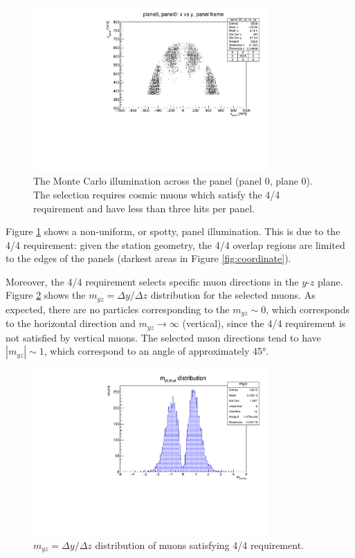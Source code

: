 \begin{figure}[!h]
    \centering
    \includegraphics[width =0.8\textwidth]{figures/pdf/xp_vs_yp_panel0.pdf}
    \caption[Monte Carlo illumination across 
    the panel (panel 0, plane 0).]{
        The Monte Carlo illumination 
        across the panel (panel 0, plane 0).
        The selection requires cosmic muons which 
        satisfy the 4/4 requirement and have 
        less than three hits per panel.}
    \label{fig:illumination}
\end{figure}
Figure \ref{fig:illumination} shows a 
non-uniform, or spotty, 
panel illumination. This is due to the 4/4 requirement: 
given the station geometry, the 4/4 overlap 
regions are limited to the edges of the panels (darkest 
areas in Figure \ref{fig:coordinate}). 

Moreover, the 4/4 requirement selects specific
muon directions in the $y$-$z$ plane. 
Figure \ref{fig:myz} shows the 
$m_{yz}=\Delta y /\Delta z$ distribution 
for the selected muons. 
As expected, there are no particles corresponding 
to the $m_{yz}\sim 0$, which corresponds to the  
horizontal direction and 
$m_{yz} \rightarrow \infty$ (vertical), since the 
4/4 requirement is not satisfied by vertical muons. 
The selected muon  
directions tend to have  
$|m_{yz}| \sim 1$, which correspond to  
an angle of approximately 45°.
\begin{figure}[!h]
    \centering
    \includegraphics[width =0.8\textwidth]{figures/pdf/myz.pdf}
    \caption[The $y-z$ direction 
    distribution of muons satisfying 4/4 requirement.]{
        $m_{yz}=\Delta y /\Delta z$  
    distribution of muons satisfying 4/4 requirement.}
    \label{fig:myz}
\end{figure}


